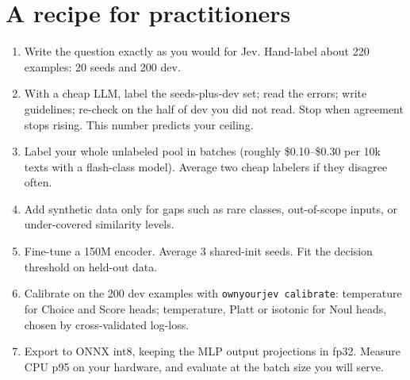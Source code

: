 \documentclass[11pt]{article}
\begin{document}
\section{A recipe for practitioners}\label{sec:recipe}
\begin{enumerate}
  \item Write the question exactly as you would for Jev. Hand-label about 220 examples: 20 seeds and 200 dev.
  \item With a cheap LLM, label the seeds-plus-dev set; read the errors; write guidelines; re-check on the half of dev you did not read. Stop when agreement stops rising. This number predicts your ceiling.
  \item Label your whole unlabeled pool in batches (roughly \$0.10--\$0.30 per 10k texts with a flash-class model). Average two cheap labelers if they disagree often.
  \item Add synthetic data only for gaps such as rare classes, out-of-scope inputs, or under-covered similarity levels.
  \item Fine-tune a 150M encoder. Average 3 shared-init seeds. Fit the decision threshold on held-out data.
  \item Calibrate on the 200 dev examples with \texttt{ownyourjev calibrate}: temperature for Choice and Score heads; temperature, Platt or isotonic for Noul heads, chosen by cross-validated log-loss.
  \item Export to ONNX int8, keeping the MLP output projections in fp32. Measure CPU p95 on your hardware, and evaluate at the batch size you will serve.
\end{enumerate}
\end{document}
